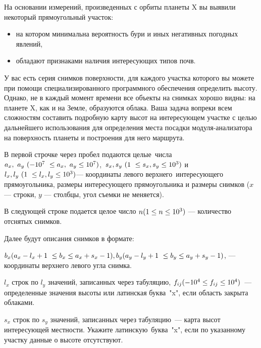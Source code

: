 
На основании измерений, произведенных с орбиты планеты X вы выявили некоторый прямоугольный участок:

\begin{itemize}
\item на котором минимальна вероятность бури и иных негативных погодных явлений,
\item обладают признаками наличия интересующих типов почв.
\end{itemize}

У вас есть серия снимков поверхности, для каждого участка которого вы можете при помощи специализированного программного обеспечения определить высоту. Однако, не в каждый момент времени все объекты на снимках хорошо видны: на планете X, как и на Земле, образуются облака. Ваша задача вопреки всем сложностям составить подробную карту высот на интересующем участке с целью дальнейшего использования для определения места посадки модуля-анализатора на поверхность планеты и построения для него маршрута. 


В первой строчке через пробел подаются целые числа $a_x, a_y \space (-10^7 \leq a_x, a_y \leq 10^7)$, $s_x, s_y \space (1 \leq s_x, s_y \leq 10^3)$ и $l_x, l_y \space (1 \leq l_x, l_y \leq 10^3)$— координаты левого верхнего интересующего прямоугольника, размеры интересующего прямоугольника и размеры снимков ($x$ — строки, $y$ — столбцы, угол съемки не меняется).

В следующей строке подается целое число $n\space(1\leq n\leq 10^3)$ — количество отснятых снимков.

Далее будут описания снимков в формате:

\begin{itemsize}
\item $b_x\space (a_x-l_x+1 \leq b_x\leq a_x+s_x-1), b_y \space (a_y-l_y+1 \leq b_y\leq a_y+s_y-1)$, — координаты верхнего левого угла снимка.
\item $l_x$ строк по $l_y$ значений, записанных через табуляцию, $f_{ij}\space (-10^4\leq f_{ij}\leq 10^4)$ — определенные значения высоты или латинская буква "x", если область закрыта облаками.
\end{itemsize}

\outputfmtSection

$s_x$ строк по $s_y$ значений, записанных через табуляцию — карта высот интересующей местности. Укажите латинскую буква "x", если по указанному участку данные о высоте отсутствуют.

